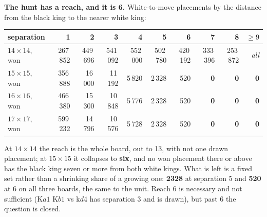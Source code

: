 \documentclass[10pt]{article}
\begin{document}
\medskip
\noindent
\textbf{The hunt has a reach, and it is 6.} White-to-move placements by the
distance from the black king to the nearer white king:

\begin{center}\small
\begin{tabular}{@{}lrrrrrrrrr@{}}
\toprule
separation & 1 & 2 & 3 & 4 & 5 & 6 & 7 & 8 & $\ge 9$\\
\midrule
$14\times14$, won   & 267\,852 & 449\,696 & 541\,092 & 552\,000 & 502\,780 & 420\,192 & 333\,396 & 253\,872 & \emph{all}\\
$15\times15$, won   & 356\,888 & 16\,000 & 11\,192 & 5\,820 & 2\,328 & 520 & \textbf{0} & \textbf{0} & \textbf{0}\\
$16\times16$, won   & 466\,380 & 15\,300 & 10\,848 & 5\,776 & 2\,328 & 520 & \textbf{0} & \textbf{0} & \textbf{0}\\
$17\times17$, won   & 599\,232 & 14\,796 & 10\,576 & 5\,728 & 2\,328 & 520 & \textbf{0} & \textbf{0} & \textbf{0}\\
\bottomrule
\end{tabular}
\end{center}

\noindent
At $14\times14$ the reach is the whole board, out to 13, with not one drawn
placement; at $15\times15$ it collapses to \textbf{six}, and no won placement
there or above has the black king seven or more from both white kings. What is
left is a fixed set rather than a shrinking share of a growing one:
\textbf{2328} at separation 5 and \textbf{520} at 6 on all three boards, the
same to the unit. Reach 6 is necessary and not sufficient
(K$a1$ K$b1$ vs k$d4$ has separation 3 and is drawn), but past 6 the question
is closed.
\end{document}
